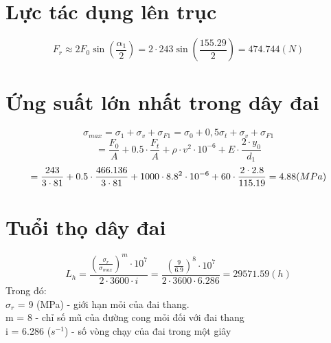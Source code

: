 \section{Lực tác dụng lên trục}
\[
    F_r \approx 2F_0\sin(\frac{\alpha_1}{2}) = 2\cdot 243\sin(\frac{155.29}{2}) = 474.744 (N) 
\]
\section{Ứng suất lớn nhất trong dây đai}
\[
    \sigma_{max} = \sigma_1 + \sigma_v + \sigma_{F1} = \sigma_0 + 0,5\sigma_t + \sigma_v + \sigma_{F1} 
\]
\[
    = \frac{F_0}{A} + 0.5\cdot \frac{F_t}{A} + \rho \cdot v^2\cdot 10^{-6} + E\cdot \frac{2\cdot y_0}{d_1} 
\]
\[
    = \frac{243}{3\cdot 81} + 0.5\cdot \frac{466.136}{3\cdot 81} + 1000\cdot 8.8^2\cdot 10^{-6} + 60\cdot \frac{2\cdot 2.8}{115.19} = 4.88 (MPa) \\
\]
\section{Tuổi thọ dây đai}
\[
    L_h = \frac{(\frac{\sigma_r}{\sigma_{max}})^m\cdot 10^7}{2\cdot 3600\cdot i} = \frac{(\frac{9}{6.9})^8\cdot10^7}{2\cdot3600\cdot6.286} = 29571.59 (h)
\]
Trong đó:\\
$\sigma_r$ = 9 (MPa) - giới hạn mỏi của đai thang.\\
m = 8 - chỉ số mũ của đường cong mỏi đối với đai thang\\
i = 6.286 ($s^{-1}$) - số vòng chạy của đai trong một giây\\
\cleardoublepage
